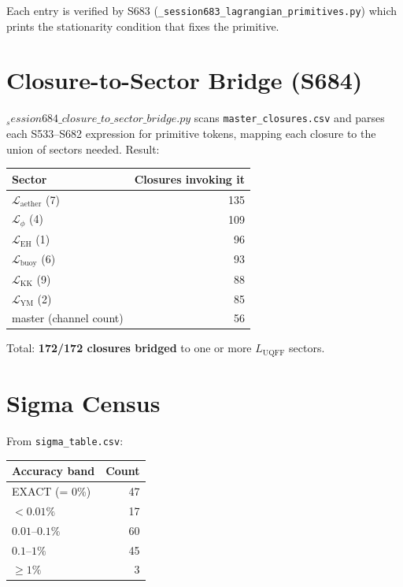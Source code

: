 \documentclass[11pt]{article}
\begin{document}
Each entry is verified by S683 (\texttt{\_session683\_lagrangian\_primitives.py})
which prints the stationarity condition that fixes the primitive.

\section*{Closure-to-Sector Bridge (S684)}
$_session684\_closure\_to\_sector\_bridge.py$ scans
\texttt{master\_closures.csv} and parses each S533--S682 expression for
primitive tokens, mapping each closure to the union of sectors needed.
Result:
\begin{center}
\begin{tabular}{lr}
\toprule
Sector & Closures invoking it \\
\midrule
$\mathcal{L}_{\mathrm{aether}}$ (7) & 135 \\
$\mathcal{L}_{\phi}$            (4) & 109 \\
$\mathcal{L}_{\mathrm{EH}}$     (1) &  96 \\
$\mathcal{L}_{\mathrm{buoy}}$   (6) &  93 \\
$\mathcal{L}_{\mathrm{KK}}$     (9) &  88 \\
$\mathcal{L}_{\mathrm{YM}}$     (2) &  85 \\
master (channel count)              &  56 \\
\bottomrule
\end{tabular}
\end{center}
Total: \textbf{172/172 closures bridged} to one or more $L_{\mathrm{UQFF}}$ sectors.

\section*{Sigma Census}
From \texttt{sigma\_table.csv}:
\begin{center}
\begin{tabular}{lr}
\toprule
Accuracy band & Count \\
\midrule
EXACT (= 0\%)        & 47 \\
$< 0.01\%$           & 17 \\
$0.01$--$0.1\%$      & 60 \\
$0.1$--$1\%$         & 45 \\
$\geq 1\%$           &  3 \\
\bottomrule
\end{tabular}
\end{center}
\end{document}
